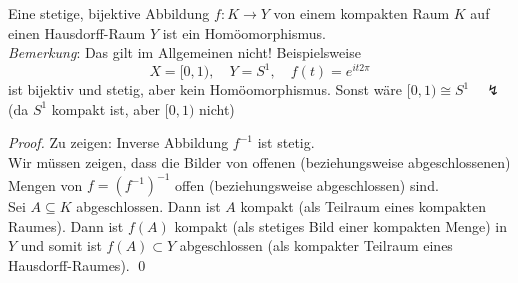 \begin{theorem}
  Eine stetige, bijektive Abbildung \( f : K \to Y \) von einem kompakten Raum \( K \) auf einen Hausdorff-Raum \( Y \) ist ein Homöomorphismus. \\
  \emph{Bemerkung}: Das gilt im Allgemeinen nicht! Beispielsweise
  \begin{equation*}
    X = [0,1), \quad Y = S^1, \quad f(t) = e^{it2\pi}
  \end{equation*}
  ist bijektiv und stetig, aber kein Homöomorphismus. Sonst wäre \( [0,1) \cong S^1 \quad \lightning \) (da \( S^1 \) kompakt ist, aber \( [0,1) \) nicht)
  \begin{proof}
    Zu zeigen: Inverse Abbildung \( f^{-1} \) ist stetig. \\
    Wir müssen zeigen, dass die Bilder von offenen (beziehungsweise abgeschlossenen) Mengen von \( f = {\left( f^{-1} \right)}^{-1} \) offen (beziehungsweise abgeschlossen) sind. \\
    Sei \( A \subseteq K \) abgeschlossen. Dann ist \( A \) kompakt (als Teilraum eines kompakten Raumes). Dann ist \( f(A) \) kompakt (als stetiges Bild einer kompakten Menge) in \( Y \) und somit ist \( f(A) \subset Y \) abgeschlossen (als kompakter Teilraum eines Hausdorff-Raumes). \qed{}
  \end{proof}
\end{theorem}
